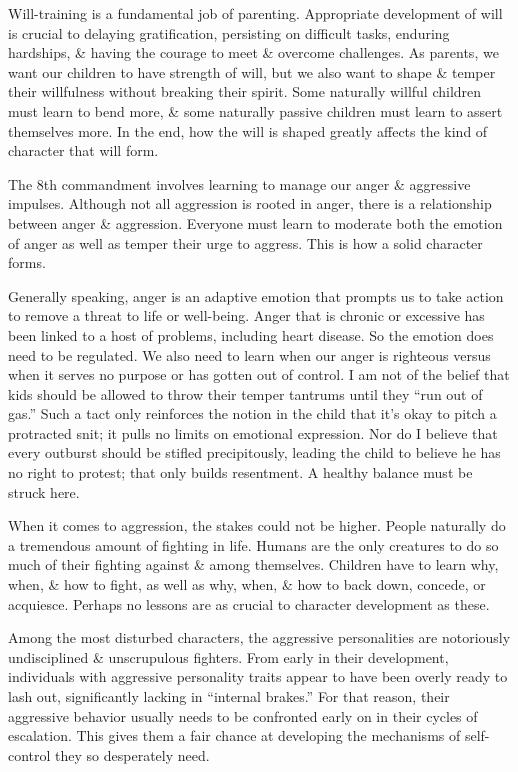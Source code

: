 \documentclass{article}
\numberwithin{equation}{section}
\begin{document}
Will-training is a fundamental job of parenting. Appropriate development of will is crucial to delaying gratification, persisting on difficult tasks, enduring hardships, \& having the courage to meet \& overcome challenges. As parents, we want our children to have strength of will, but we also want to shape \& temper their willfulness without breaking their spirit. Some naturally willful children must learn to bend more, \& some naturally passive children must learn to assert themselves more. In the end, how the will is shaped greatly affects the kind of character that will form.

The 8th commandment involves learning to manage our anger \& aggressive impulses. Although not all aggression is rooted in anger, there is a relationship between anger \& aggression. Everyone must learn to moderate both the emotion of anger as well as temper their urge to aggress. This is how a solid character forms.

Generally speaking, anger is an adaptive emotion that prompts us to take action to remove a threat to life or well-being. Anger that is chronic or excessive has been linked to a host of problems, including heart disease. So the emotion does need to be regulated. We also need to learn when our anger is righteous versus when it serves no purpose or has gotten out of control. I am not of the belief that kids should be allowed to throw their temper tantrums until they ``run out of gas.'' Such a tact only reinforces the notion in the child that it's okay to pitch a protracted snit; it pulls no limits on emotional expression. Nor do I believe that every outburst should be stifled precipitously, leading the child to believe he has no right to protest; that only builds resentment. A healthy balance must be struck here.

When it comes to aggression, the stakes could not be higher. People naturally do a tremendous amount of fighting in life. Humans are the only creatures to do so much of their fighting against \& among themselves. Children have to learn why, when, \& how to fight, as well as why, when, \& how to back down, concede, or acquiesce. Perhaps no lessons are as crucial to character development as these.

Among the most disturbed characters, the aggressive personalities are notoriously undisciplined \& unscrupulous fighters. From early in their development, individuals with aggressive personality traits appear to have been overly ready to lash out, significantly lacking in ``internal brakes.'' For that reason, their aggressive behavior usually needs to be confronted early on in their cycles of escalation. This gives them a fair chance at developing the mechanisms of self-control they so desperately need.
\end{document}

